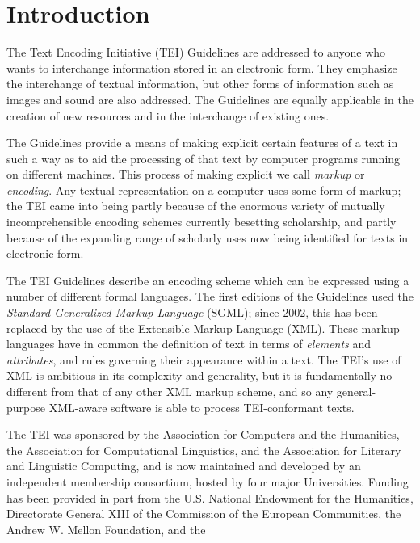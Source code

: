 \documentclass[11pt,twoside]{article}\makeatletter
\makeatletter
\renewcommand\section{\@startsection {section}{1}{\z@}%
     {-1.75ex \@plus -0.5ex \@minus -.2ex}%
     {0.5ex \@plus .2ex}%
     {\reset@font\Large\bfseries\sffamily}}
\def\DivI{\section}
\def\DivI{\chapter}
\makeatother
\begin{document}
\DivI[Introduction]{Introduction}\label{U5-Intro}\par The Text Encoding Initiative (TEI) Guidelines are addressed to
anyone who wants to interchange information stored in an electronic
form. They emphasize the interchange of textual information, but other
forms of information such as images and sound are also addressed. The
Guidelines are equally applicable in the creation of new resources and
in the interchange of existing ones.\par The Guidelines provide a means of making explicit certain
        features of a text in such a way as to aid the processing of
        that text by computer programs running on different
        machines. This process of making explicit we call
        \emph{markup} or \emph{encoding}.  Any textual
        representation on a computer uses some form of markup; the TEI
        came into being partly because of the enormous variety of
        mutually incomprehensible encoding schemes currently besetting
        scholarship, and partly because of the expanding range of
        scholarly uses now being identified for texts in electronic
        form.\par The TEI Guidelines describe an encoding scheme which can be
        expressed using a number of different formal languages. The
        first editions of the Guidelines used the \emph{Standard
        Generalized Markup Language} (SGML); since 2002, this
        has been replaced by the use of the Extensible Markup Language
        (XML). These markup languages have in common the definition of
        text in terms of \emph{elements} and
        \emph{attributes}, and rules governing their appearance
        within a text. The TEI's use of XML is ambitious in its
        complexity and generality, but it is fundamentally no
        different from that of any other XML markup scheme, and so any
        general-purpose XML-aware software is able to process
        TEI-conformant texts.\par The TEI was sponsored by the Association for Computers and
        the Humanities, the Association for Computational Linguistics,
        and the Association for Literary and Linguistic Computing, and
        is now maintained and developed by an independent membership
        consortium, hosted by four major Universities. Funding has
        been provided in part from the U.S. National Endowment for the
        Humanities, Directorate General XIII of the Commission of the
        European Communities, the Andrew W. Mellon Foundation, and the
\end{document}
